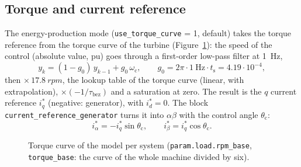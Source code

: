 \documentclass[11pt,a4paper]{scrartcl}
\newcommand{\ped}[1]{_{\mathrm{#1}}}
\newcommand{\code}[1]{\texttt{#1}}
\begin{document}
\begin{onehalfspace}
\section{Torque and current reference}
\label{sec:reference}

The energy-production mode (\code{use\_torque\_curve} = 1, default) takes the torque reference from the torque curve of the turbine (Figure~\ref{fig:torquecurve}): the speed of the control (absolute value, pu) goes through a first-order low-pass filter at \SI{1}{\hertz},
\begin{equation}
	y_k = (1 - g_0)\,y_{k-1} + g_0\,\omega\ped{c}, \qquad g_0 = 2\pi\cdot\SI{1}{\hertz}\cdot t\ped{s} = 4.19\cdot10^{-4},
\end{equation}
then $\times\,\SI{17.8}{rpm}$, the lookup table of the torque curve (linear, with extrapolation), $\times(-1/\tau\ped{bez})$ and a saturation at zero. The result is the $q$ current reference $i_q^*$ (negative: generator), with $i_d^* = 0$. The block \code{current\_reference\_generator} turns it into $\alpha\beta$ with the control angle $\theta\ped{c}$:
\begin{equation}
	i_\alpha^* = -i_q^*\sin\theta\ped{c}, \qquad i_\beta^* = i_q^*\cos\theta\ped{c} .
\end{equation}

\begin{figure}[H]
	\centering
	\caption{Torque curve of the model per system (\code{param.load.rpm\_base}, \code{torque\_base}: the curve of the whole machine divided by six).}
	\label{fig:torquecurve}
\end{figure}


\end{onehalfspace}
\end{document}
